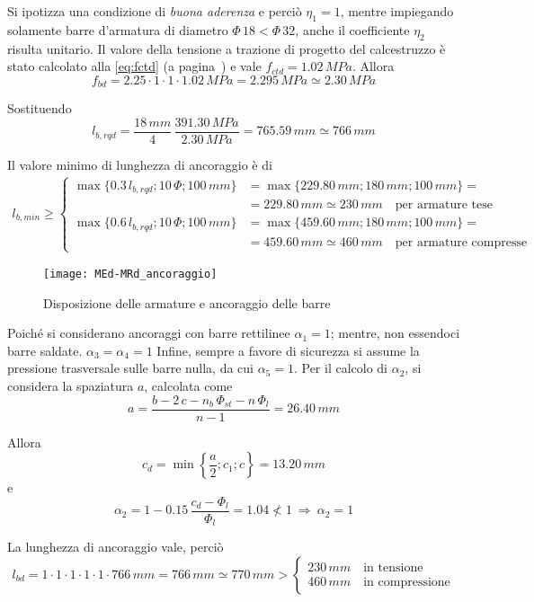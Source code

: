 Si ipotizza una condizione di \textit{buona aderenza} e perciò $\eta_1 = 1$, mentre impiegando solamente barre d'armatura di diametro $\Phi\,18 < \Phi\,32$, anche il coefficiente $\eta_2$ risulta unitario. Il valore della tensione a trazione di progetto del calcestruzzo è stato calcolato alla \eqref{eq:fctd} (a pagina~\pageref{eq:fctd}) e vale $f_{ctd} = 1.02\,MPa$. Allora
\[
f_{bd} = 2.25\cdot 1\cdot 1\cdot 1.02\,MPa = 2.295\,MPa \simeq 2.30\,MPa
\]

Sostituendo 
\[
l_{b,rqd} = \dfrac{18\,mm}{4}\,\dfrac{391.30\,MPa}{2.30\,MPa} = 765.59\,mm \simeq 766\,mm
\]

Il valore minimo di lunghezza di ancoraggio è di 
\begin{align*}
	l_{b,min} \geq \begin{cases}
		\max\{0.3\,l_{b,rqd}; 10\,\Phi; 100\,mm\} &= \max\{229.80\,mm; 180\,mm; 100\,mm\} =\\ &= 229.80\,mm\simeq 230\,mm \quad \text{per armature tese}\\
		\max\{0.6\,l_{b,rqd}; 10\,\Phi; 100\,mm\} &= \max\{459.60\,mm; 180\,mm; 100\,mm\} =\\&= 459.60\,mm\simeq 460\,mm \quad \text{per armature compresse}
	            \end{cases}
\end{align*}

\begin{figure}
	\centering
	\texttt{[image: MEd-MRd\_ancoraggio]}
	\caption{Disposizione delle armature e ancoraggio delle barre} 
	\label{fig:MEd-MRd_ancoraggio}
\end{figure}

Poiché si considerano ancoraggi con barre rettilinee $\alpha_1 = 1$; mentre, non essendoci barre saldate. $\alpha_3 = \alpha_4 = 1$  Infine, sempre a favore di sicurezza si assume la pressione trasversale sulle barre nulla, da cui $\alpha_5 = 1$. Per il calcolo di $\alpha_2$, si considera la spaziatura $a$, calcolata come
\[
a = \dfrac{b - 2\,c - n_b\,\Phi_{st}-n\,\Phi_l}{n-1} = 26.40\,mm
\]

Allora
\[ 
c_d = \min\left\{\dfrac{a}{2}; c_1; c\right\} = 13.20\,mm
\]
e
\[
\alpha_2 = 1-0.15\,\dfrac{c_d - \Phi_l}{\Phi_l} = 1.04 \nless 1 ~ \Longrightarrow~ \alpha_2 = 1
\]


La lunghezza di ancoraggio vale, perciò
\[
l_{bd} = 1\cdot1\cdot1\cdot1\cdot1\cdot 766\,mm = 766\,mm\simeq 770\,mm > \begin{cases}
	230\,mm \quad \text{in tensione}\\
	460\,mm \quad \text{in compressione}
                                                                  \end{cases}
\]

\pagebreak
\thispagestyle{empty}
\cleardoublepage
